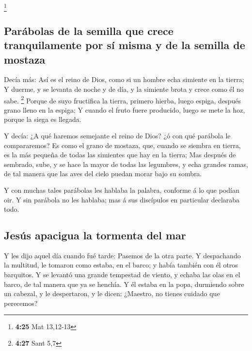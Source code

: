 \footnote{\textbf{4:25} Mat 13,12-13}

\hypertarget{paruxe1bolas-de-la-semilla-que-crece-tranquilamente-por-suxed-misma-y-de-la-semilla-de-mostaza}{%
\subsection{Parábolas de la semilla que crece tranquilamente por sí
misma y de la semilla de
mostaza}\label{paruxe1bolas-de-la-semilla-que-crece-tranquilamente-por-suxed-misma-y-de-la-semilla-de-mostaza}}

 Decía más: Así es el reino de Dios, como si un hombre echa
simiente en la tierra;  Y duerme, y se levanta de noche y
de día, y la simiente brota y crece como él no sabe. \footnote{\textbf{4:27}
  Sant 5,7}  Porque de suyo fructifica la tierra, primero
hierba, luego espiga, después grano lleno en la espiga;  Y
cuando el fruto fuere producido, luego se mete la hoz, porque la siega
es llegada.

 Y decía: ¿A qué haremos semejante el reino de Dios? ¿ó con
qué parábola le compararemos?  Es como el grano de mostaza,
que, cuando se siembra en tierra, es la más pequeña de todas las
simientes que hay en la tierra;  Mas después de sembrado,
sube, y se hace la mayor de todas las legumbres, y echa grandes ramas,
de tal manera que las aves del cielo puedan morar bajo su sombra.

 Y con muchas tales parábolas les hablaba la palabra,
conforme á lo que podían oir.  Y sin parábola no les
hablaba; mas á sus discípulos en particular declaraba todo.

\hypertarget{jesuxfas-apacigua-la-tormenta-del-mar}{%
\subsection{Jesús apacigua la tormenta del
mar}\label{jesuxfas-apacigua-la-tormenta-del-mar}}

 Y les dijo aquel día cuando fué tarde: Pasemos de la otra
parte.  Y despachando la multitud, le tomaron como estaba,
en el barco; y había también con él otros barquitos.  Y se
levantó una grande tempestad de viento, y echaba las olas en el barco,
de tal manera que ya se henchía.  Y él estaba en la popa,
durmiendo sobre un cabezal, y le despertaron, y le dicen: ¿Maestro, no
tienes cuidado que perecemos?

